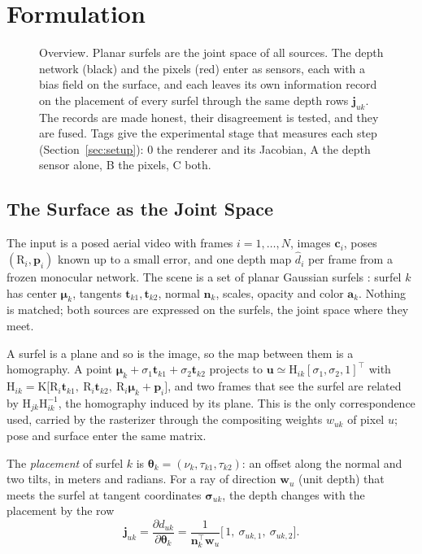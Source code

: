 \section{Formulation}
\label{sec:method}

\begin{figure}[!t]
\centering

\caption{Overview. Planar surfels are the joint space of all sources. The depth network (black) and the
pixels (red) enter as sensors, each with a bias field on the surface, and each leaves its own information
record on the placement of every surfel through the same depth rows $\mathbf j_{uk}$. The records are made
honest, their disagreement is tested, and they are fused. Tags give the experimental stage that measures
each step (Section~\ref{sec:setup}): 0 the renderer and its Jacobian, A the depth sensor alone, B the
pixels, C both.}
\label{fig:overview}
\end{figure}

\subsection{The Surface as the Joint Space}
\label{sec:method:setting}
The input is a posed aerial video with frames $i=1,\dots,N$, images $\mathbf c_i$, poses
$(\mathrm R_i,\mathbf p_i)$ known up to a small error, and one depth map $\hat d_i$ per frame from a frozen
monocular network. The scene is a set of planar Gaussian surfels \cite{gs_2dgs}: surfel $k$ has center
$\boldsymbol\mu_k$, tangents $\mathbf t_{k1},\mathbf t_{k2}$, normal $\mathbf n_k$, scales, opacity and
color $\mathbf a_k$. Nothing is matched; both sources are expressed on the surfels, the joint space where they meet.

A surfel is a plane and so is the image, so the map between them is a homography. A point
$\boldsymbol\mu_k+\sigma_1\mathbf t_{k1}+\sigma_2\mathbf t_{k2}$ projects to
$\mathbf u\simeq\mathrm H_{ik}[\sigma_1,\sigma_2,1]^{\top}$ with
$\mathrm H_{ik}=\mathrm K\bigl[\mathrm R_i\mathbf t_{k1},\ \mathrm R_i\mathbf t_{k2},\
\mathrm R_i\boldsymbol\mu_k+\mathbf p_i\bigr]$, and two frames that see the surfel are related by
$\mathrm H_{jk}\mathrm H_{ik}^{-1}$, the homography induced by its plane. This is the only correspondence used, carried by the rasterizer \cite{gs_gsplat} through the
compositing weights $w_{uk}$ of pixel $u$; pose and surface enter the same matrix.

The \emph{placement} of surfel $k$ is $\boldsymbol\theta_k=(\nu_k,\tau_{k1},\tau_{k2})$: an offset along
the normal and two tilts, in meters and radians. For a ray of direction $\mathbf w_u$ (unit depth) that
meets the surfel at tangent coordinates $\boldsymbol\sigma_{uk}$, the depth changes with the placement by
the row
\begin{equation}
\mathbf j_{uk}=\frac{\partial d_{uk}}{\partial\boldsymbol\theta_k}
=\frac{1}{\mathbf n_k^{\top}\mathbf w_u}\bigl[\,1,\ \sigma_{uk,1},\ \sigma_{uk,2}\bigr].
\label{eq:depthjac}
\end{equation}


